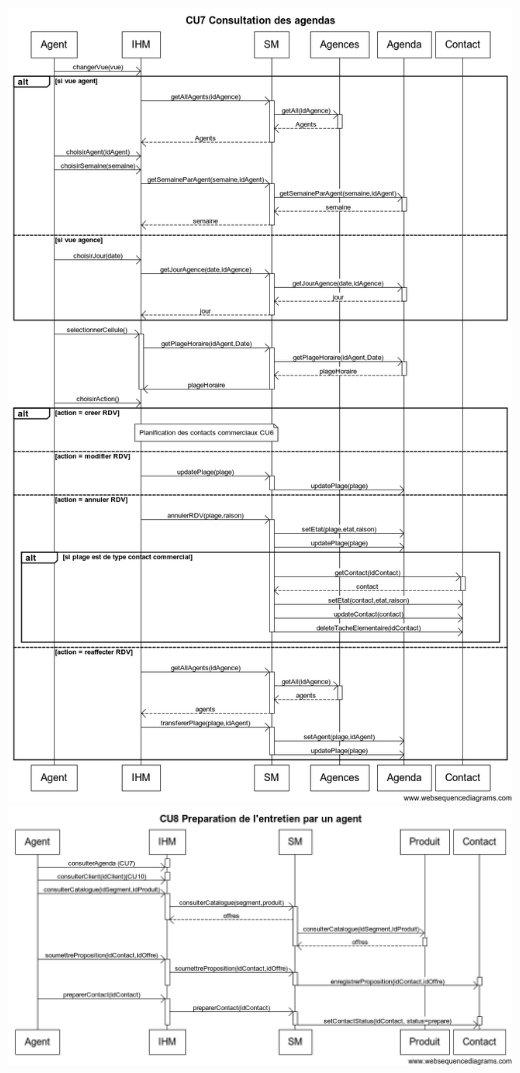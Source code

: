 \begin {center}
\includegraphics[width=\textwidth]{../../webSequenceDiagrameSources/cu7.png}
\includegraphics[width=\textwidth]{../../webSequenceDiagrameSources/cu8.png}

\end{center}
